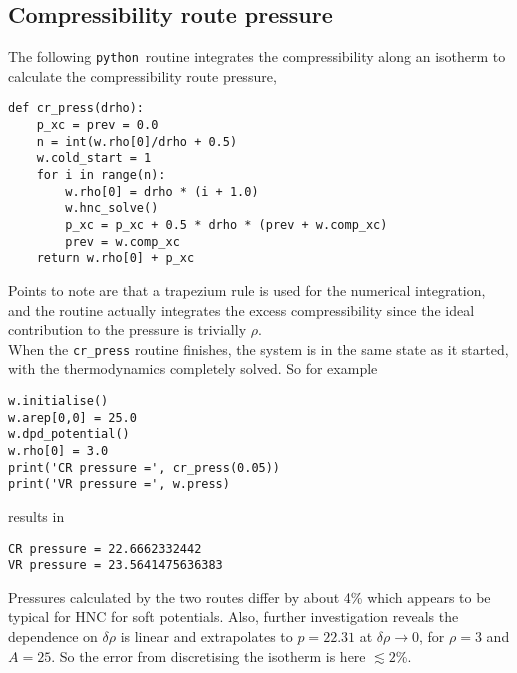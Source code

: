 \documentclass[12pt,a4paper]{article}
\newcommand{\alt}{\lesssim}
\newcommand{\python}{{\tt python}}
\begin{document}
\subsection{Compressibility route pressure}
%
The following \python\ routine integrates the compressibility along an
isotherm to calculate the compressibility route pressure,
%
\begin{verbatim}
def cr_press(drho):
    p_xc = prev = 0.0
    n = int(w.rho[0]/drho + 0.5)
    w.cold_start = 1
    for i in range(n):
        w.rho[0] = drho * (i + 1.0)
        w.hnc_solve()
        p_xc = p_xc + 0.5 * drho * (prev + w.comp_xc)
        prev = w.comp_xc
    return w.rho[0] + p_xc
\end{verbatim}
%
Points to note are that a trapezium rule is used for the numerical
integration, and the routine actually integrates the excess
compressibility since the ideal contribution to the pressure is
trivially $\rho$.\\

When the \verb+cr_press+ routine finishes, the
system is in the same state as it started, with the thermodynamics
completely solved.  So for example
%
\begin{verbatim}
w.initialise()
w.arep[0,0] = 25.0
w.dpd_potential()
w.rho[0] = 3.0
print('CR pressure =', cr_press(0.05))
print('VR pressure =', w.press)
\end{verbatim}
%
results in
%
\begin{verbatim}
CR pressure = 22.6662332442
VR pressure = 23.5641475636383
\end{verbatim}
%
Pressures calculated by the two routes differ by about 4\%
which appears to be typical for HNC for soft potentials.  Also,
further investigation reveals the dependence on $\delta\rho$ is linear
and extrapolates to $p=22.31$ at $\delta\rho\to0$, for $\rho=3$ and
$A=25$.  So the error from discretising the isotherm is here $\alt2$\%.
\end{document}
